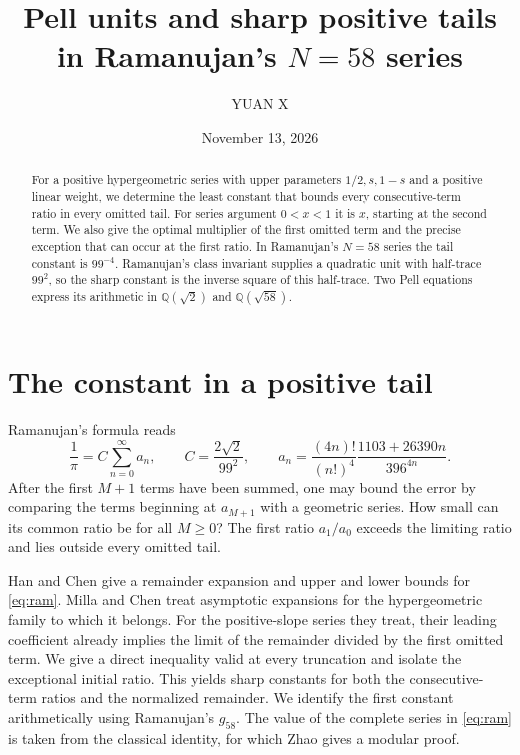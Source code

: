 \documentclass[11pt,reqno]{amsart}
\title[Pell units and sharp positive tails]{Pell units and sharp positive tails in Ramanujan's \texorpdfstring{$N=58$}{N=58} series}
\author{YUAN X}
\date{November 13, 2026}
\begin{document}
\begin{abstract}
For a positive hypergeometric series with upper parameters
$1/2,s,1-s$ and a positive linear weight, we determine the least constant
that bounds every consecutive-term ratio in every omitted tail. For series
argument $0<x<1$ it is $x$, starting at the second term. We also give the
optimal multiplier of the first omitted term and the precise exception
that can occur at the first ratio. In Ramanujan's $N=58$ series the tail
constant is $99^{-4}$. Ramanujan's class invariant supplies a quadratic
unit with half-trace $99^2$, so the sharp constant is the inverse square of
this half-trace. Two Pell equations express its arithmetic in
$\mathbb Q(\sqrt{2})$ and $\mathbb Q(\sqrt{58})$.
\end{abstract}
\maketitle

\section{The constant in a positive tail}

Ramanujan's formula \cite[\S14, (44)]{Ramanujan} reads
\begin{equation}\label{eq:ram}
 \frac1\pi=C\sum_{n=0}^{\infty}a_n,\qquad
 C=\frac{2\sqrt2}{99^2},\qquad
 a_n=\frac{(4n)!}{(n!)^4}\frac{1103+26390n}{396^{4n}} .
\end{equation}
After the first $M+1$ terms have been summed, one may bound the error by
comparing the terms beginning at $a_{M+1}$ with a geometric series. How
small can its common ratio be for all $M\geq0$? The first ratio $a_1/a_0$
exceeds the limiting ratio and lies outside every omitted tail.

Han and Chen \cite{HanChen} give a remainder expansion and upper and lower
bounds for \eqref{eq:ram}. Milla and Chen \cite{MillaChen} treat asymptotic
expansions for the hypergeometric family to which it belongs. For the
positive-slope series they treat, their leading coefficient already implies
the limit of the remainder divided by the first omitted term. We give a
direct inequality valid at every truncation and isolate the exceptional
initial ratio. This yields sharp constants for both the consecutive-term
ratios and the normalized remainder. We identify the first constant
arithmetically using Ramanujan's $g_{58}$. The value of the complete
series in \eqref{eq:ram} is taken from the classical identity, for which
Zhao \cite{Zhao} gives a modular proof.
\end{document}
